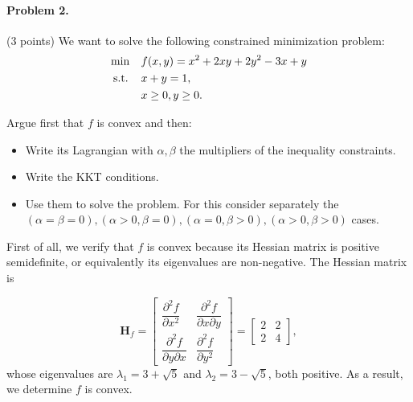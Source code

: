 \documentclass[12pt]{scrartcl}
\begin{document}
\begin{boxF}
\paragraph*{Problem 2.} (3 points) \hspace{0.15em} We want to solve the following constrained minimization problem: 
    \begin{align*}
        \mbox{min   \hspace{0.7em}}  & f(x, y) = x^2 + 2xy + 2y^2 - 3x + y \\
        \mbox{s.t.  \hspace{0.7em}} & x + y = 1, \\
        & x \geq 0, y \geq 0.
    \end{align*}
    
Argue first that $f$ is convex and then:

\begin{itemize}
    \item Write its Lagrangian with $\alpha, \beta$ the multipliers of the inequality constraints.
    \item Write the KKT conditions.
    \item Use them to solve the problem. For this consider separately the $(\alpha = \beta = 0), (\alpha > 0, \beta = 0), (\alpha = 0, \beta > 0), (\alpha > 0, \beta > 0)$ cases.
\end{itemize}

\end{boxF}


First of all, we verify that $f$ is convex because its Hessian matrix is positive semidefinite, or equivalently its eigenvalues are non-negative. The Hessian matrix is

\[
\mathbf{H}_f = \begin{bmatrix}\dfrac{\partial^2 f}{\partial x^2} & \dfrac{\partial^2 f}{\partial x \partial y} \\[1em]
    \dfrac{\partial^2 f}{\partial y \partial x} & \dfrac{\partial^2 f}{\partial y^2}\end{bmatrix} = \begin{bmatrix}
        2 & 2 \\ 2 & 4
    \end{bmatrix},
\]
whose eigenvalues are $\lambda_1 = 3 + \sqrt{5}$ and $\lambda_2 = 3 - \sqrt{5}$, both positive. As a result, we determine $f$ is convex.\\
\end{document}
